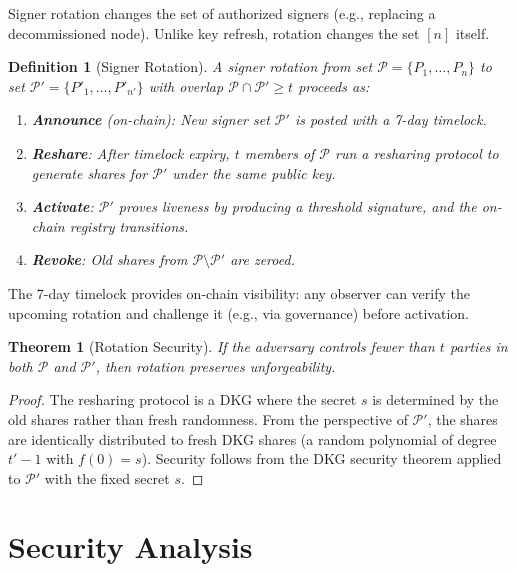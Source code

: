 \documentclass[11pt,twocolumn]{article}
\newtheorem{theorem}{Theorem}[section]
\newtheorem{definition}{Definition}[section]
\begin{document}
Signer rotation changes the set of authorized signers (e.g., replacing a
decommissioned node). Unlike key refresh, rotation changes the set $[n]$ itself.

\begin{definition}[Signer Rotation]
A signer rotation from set $\mathcal{P} = \{P_1, \ldots, P_n\}$ to set
$\mathcal{P}' = \{P'_1, \ldots, P'_{n'}\}$ with overlap
$\mathcal{P} \cap \mathcal{P}' \geq t$ proceeds as:
\begin{enumerate}[nosep]
  \item \textbf{Announce} (on-chain): New signer set $\mathcal{P}'$ is posted with a
    7-day timelock.
  \item \textbf{Reshare}: After timelock expiry, $t$ members of $\mathcal{P}$ run a
    resharing protocol to generate shares for $\mathcal{P}'$ under the same public key.
  \item \textbf{Activate}: $\mathcal{P}'$ proves liveness by producing a threshold
    signature, and the on-chain registry transitions.
  \item \textbf{Revoke}: Old shares from $\mathcal{P} \setminus \mathcal{P}'$ are
    zeroed.
\end{enumerate}
\end{definition}

The 7-day timelock provides on-chain visibility: any observer can verify the upcoming
rotation and challenge it (e.g., via governance) before activation.

\begin{theorem}[Rotation Security]
\label{thm:rotation-sec}
If the adversary controls fewer than $t$ parties in both $\mathcal{P}$ and
$\mathcal{P}'$, then rotation preserves unforgeability.
\end{theorem}

\begin{proof}
The resharing protocol is a DKG where the secret $s$ is determined by the old shares
rather than fresh randomness. From the perspective of $\mathcal{P}'$, the shares are
identically distributed to fresh DKG shares (a random polynomial of degree $t'-1$ with
$f(0) = s$). Security follows from the DKG security theorem applied to $\mathcal{P}'$
with the fixed secret $s$.
\end{proof}

\section{Security Analysis}
\label{sec:security}
\end{document}
